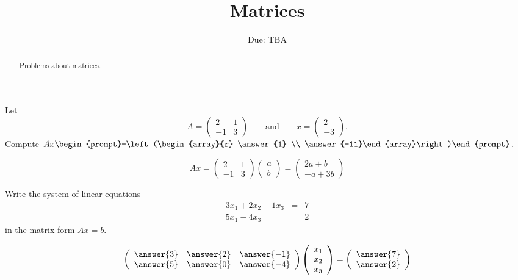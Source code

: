 \documentclass{ximera}
\title{Matrices}
\author{\phantom{Dr. Golubitsky}}
\date{Due: TBA}
\begin{document}
\begin{abstract}
Problems about matrices.  
\end{abstract}
\maketitle


\problemlabel


\begin{exercise} %
Let
\[
A = \begin{pmatrix}2 & 1 \\ -1 & 3\end{pmatrix}\qquad\textrm{and}\qquad x = \begin{pmatrix}2 \\ -3\end{pmatrix}.
\]
Compute $Ax\begin{prompt}=\left(\begin{array}{r} \answer{1} \\ \answer{-11}\end{array}\right)\end{prompt}$.
\begin{hint}
  \[
Ax =
\left(\begin{array}{rr} 2 & 1 \\ -1 & 3\end{array}\right)
\left(\begin{array}{r} a \\ b\end{array}\right) =
\left(\begin{array}{r} 2a + b \\ -a + 3b\end{array}\right)
\]
\end{hint}

\end{exercise}


\problemlabel

\begin{exercise} %
Write the system of linear equations
\begin{eqnarray*}
3x_1 + 2x_2 - 1x_3 & = & 7\\
5x_1 -4x_3 & = & 2
\end{eqnarray*}
in the matrix form $Ax=b$.

\ans 

\[
\left(\begin{array}{rrr} \answer{3} & \answer{2} & \answer{-1} \\ 
               \answer{5} & \answer{0} & \answer{-4}\end{array}\right) 
\left(\begin{array}{r} x_1 \\ x_2 \\ x_3\end{array}\right) = 
\left(\begin{array}{r}  \answer{7} \\ \answer{2}\end{array}\right)
\]


\end{exercise}
\end{document}
